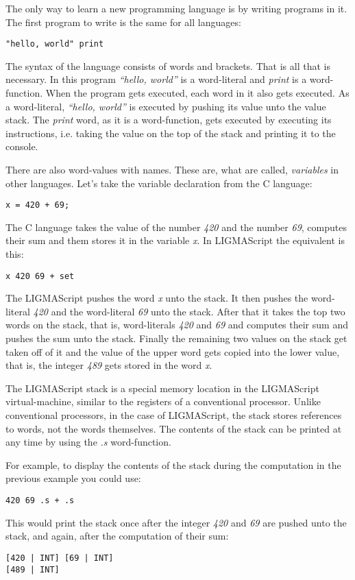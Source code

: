 \documentclass[12pt]{article}
\begin{document}
The only way to learn a new programming language is by writing programs in it. The first program to write 
is the same for all languages:

\begin{verbatim}"hello, world" print\end{verbatim}


The syntax of the language consists of words and brackets. That is all that is necessary. In this program 
\emph{``hello, world''} is a word-literal and \emph{print} is a word-function. When the program gets executed, each 
word in it also gets executed. As a word-literal, \emph{``hello, world''} is executed by pushing its value unto 
the value stack. The \emph{print} word, as it is a word-function, gets executed by executing its instructions, i.e. taking the value on the top 
of the stack and printing it to the console.

There are also word-values with names. These are, what are called, \emph{variables} in other languages. Let's take the variable declaration from the C language:
\begin{verbatim}x = 420 + 69;\end{verbatim}
The C language takes the value of the number \emph{420} and the number \emph{69}, computes their sum and them stores it 
in the variable \emph{x}. In LIGMAScript the equivalent is this:
\begin{verbatim}x 420 69 + set\end{verbatim}
The LIGMAScript pushes the word \emph{x} unto the stack. It then pushes the word-literal \emph{420} and the word-literal 
\emph{69} unto the stack. After that it takes the top two words on the stack, that is, word-literals \emph{420} and \emph{69} 
and computes their sum and pushes the sum unto the stack. Finally the remaining two values on the stack 
get taken off of it and the value of the upper word gets copied into the lower value, that is, the integer 
\emph{489} gets stored in the word \emph{x}.

The LIGMAScript stack is a special memory location in the LIGMAScript virtual-machine, similar to the registers of a conventional processor. 
Unlike conventional processors, in the case of  LIGMAScript, 
the stack stores references to words, not the words themselves. The contents of the stack can be printed at any time by using the \emph{.s} word-function.

For example, to display the contents of the stack during the computation in the previous example you could use:
\begin{verbatim}420 69 .s + .s\end{verbatim}
This would print the stack once after the integer \emph{420} and \emph{69} are pushed unto the stack, and again, after the computation of their sum:
\begin{verbatim}
[420 | INT] [69 | INT]
[489 | INT]
\end{verbatim}
\end{document}
